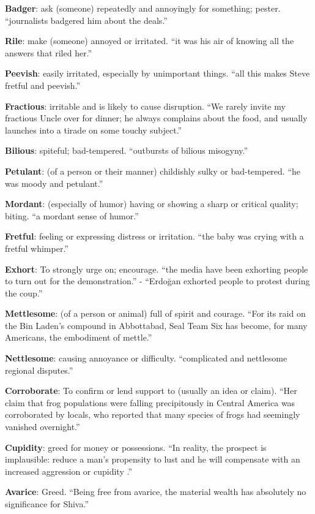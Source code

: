 \documentclass[12pt, a4paper]{ximera}
\begin{document}
\textbf{Badger}: ask (someone) repeatedly and annoyingly for something; pester. ``journalists badgered him about the deals.''

\textbf{Rile}: make (someone) annoyed or irritated. ``it was his air of knowing all the answers that riled her.''

\textbf{Peevish}: easily irritated, especially by unimportant things. ``all this makes Steve fretful and peevish.''

\textbf{Fractious}: irritable and is likely to cause disruption. ``We rarely invite my fractious Uncle over for dinner; he always complains about the food, and usually launches into a tirade on some touchy subject.''

\textbf{Bilious}: spiteful; bad-tempered. ``outbursts of bilious misogyny.''

\textbf{Petulant}: (of a person or their manner) childishly sulky or bad-tempered. ``he was moody and petulant.''

\textbf{Mordant}: (especially of humor) having or showing a sharp or critical quality; biting. ``a mordant sense of humor.''

\textbf{Fretful}: feeling or expressing distress or irritation. ``the baby was crying with a fretful whimper.''

\textbf{Exhort}: To strongly urge on; encourage. ``the media have been exhorting people to turn out for the demonstration.'' - ``Erdo\u{g}an exhorted people to protest during the coup.''

\textbf{Mettlesome}: (of a person or animal) full of spirit and courage. ``For its raid on the Bin Laden’s compound in Abbottabad, Seal Team Six has become, for many Americans, the embodiment of mettle.''

\textbf{Nettlesome}: causing annoyance or difficulty. ``complicated and nettlesome regional disputes.''

\textbf{Corroborate}: To confirm or lend support to (usually an idea or claim). ``Her claim that frog populations were falling precipitously in Central America was corroborated by locals, who reported that many species of frogs had seemingly vanished overnight.''

\textbf{Cupidity}: greed for money or possessions. ``In reality, the prospect is implausible: reduce a man's propensity to lust and he will compensate with an increased aggression or cupidity .''

\textbf{Avarice}: Greed. ``Being free from avarice, the material wealth has absolutely no significance for Shiva.''
\end{document}
